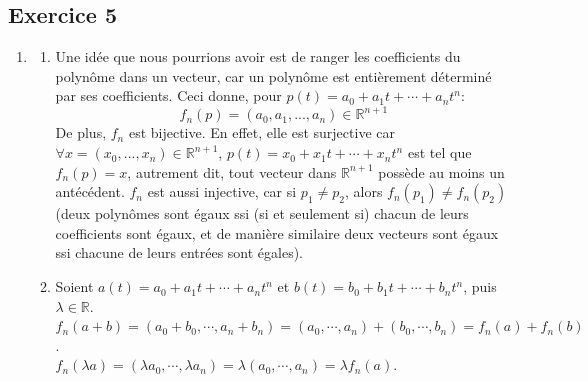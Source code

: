 \documentclass{article}
\newcommand{\R}{\mathbb{R}}
\begin{document}
\subsection*{Exercice 5}
\begin{enumerate}
    \item 
    \begin{enumerate}
        \item Une idée que nous pourrions avoir est de ranger les coefficients du polynôme dans un vecteur, car un polynôme est entièrement déterminé par ses coefficients. Ceci donne, pour $p(t) = a_0 + a_1t + \cdots + a_n t^n$:
        $$f_n(p)=(a_{0},a_{1},...,a_{n}) \in \R^{n+1}$$
        De plus, $f_n$ est bijective. En effet, elle est surjective car $\forall x = (x_0, ..., x_n) \in \R^{n+1}$, $p(t) = x_0 + x_1 t + \cdots + x_n t^n$ est tel que $f_n(p) = x$, autrement dit, tout vecteur dans $\R^{n+1}$ possède au moins un antécédent. $f_n$ est aussi injective, car si $p_1 \neq p_2$, alors $f_n(p_1) \neq f_n(p_2)$ (deux polynômes sont égaux ssi (si et seulement si) chacun de leurs coefficients sont égaux, et de manière similaire deux vecteurs sont égaux ssi chacune de leurs entrées sont égales). 
        \item Soient $a(t) = a_0 + a_1t+ \cdots + a_nt^n$ et $b(t) = b_0 + b_1t + \cdots + b_nt^n$, puis $\lambda \in \R$. \\
        $f_n(a + b) = (a_0 + b_0, \cdots, a_n + b_n) = (a_0, \cdots, a_n) + (b_0, \cdots, b_n) = f_n(a) + f_n(b)$.\\
        $f_n(\lambda a) = (\lambda a_0, \cdots, \lambda a_n) = \lambda(a_0, \cdots, a_n) = \lambda f_n(a)$.\\
        

\end{enumerate}
\end{enumerate}
\end{document}
